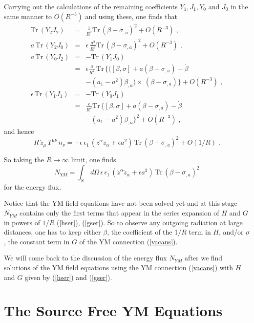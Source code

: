 \documentclass[a4paper,twocolumn,prd,showpacs,amsmath,amssymb]{revtex4}
\begin{document}
Carrying out the calculations of the remaining coefficients $Y_1, J_1, Y_0$
and $J_0$ in the same manner to $O(R^{-3})$ and using these, one finds that
\begin{eqnarray*}
\mbox{Tr} \, (Y_2 J_2) & = & \frac{1}{R^2} \mbox{Tr} \,
(\beta - \sigma_{,a})^2 + O(R^{-3}) \; , \\
a \, \mbox{Tr} \, (Y_2 J_0) & = & \epsilon \, \frac{a^2}{R^2}
\mbox{Tr} \, (\beta - \sigma_{,a})^2 + O(R^{-3}) \; ,\\
a \, \mbox{Tr} \, (Y_0 J_2) & = & - \mbox{Tr} \, (Y_1 J_0) \\
& = & \epsilon \frac{a}{R^2} \, \mbox{Tr} \,
\lbrace ([\beta,\sigma] + a(\beta - \sigma_{,a}) - \dot{\beta} \\
& &- (a_1 - a^2) \beta_{,a}) \times \, (\beta - \sigma_{,a}) \rbrace
+ O(R^{-3}) \; , \\
\epsilon \, \mbox{Tr} \, (Y_1 J_1) & = & - \mbox{Tr} \, (Y_0 J_1) \\
& = & \frac{\epsilon}{R^2} \mbox{Tr} \,
\lbrace [\beta,\sigma] + a(\beta - \sigma_{,a}) - \dot{\beta} \\
& & - (a_1 - a^2) \beta_{,a} \rbrace^2 + O(R^{-3}) \; ,
\end{eqnarray*}
and hence
\[ R\, \dot{z}_{\mu} \, T^{\mu \nu} \, n_{\nu} =
- \epsilon\, \epsilon_{1}\, (\ddot{z}^{\alpha} \ddot{z}_{\alpha} + \epsilon a^2) \,
\mbox{Tr} \, (\beta - \sigma_{,a})^2 + O(1/R) \; . \]

So taking the $R \to \infty$ limit, one finds
\begin{equation}
N_{YM} = \int_{S} \, d\Omega \, \epsilon \, \epsilon_{1} \,
(\ddot{z}^{\alpha} \ddot{z}_{\alpha} + \epsilon a^2) \,
\mbox{Tr} \, (\beta - \sigma_{,a})^2 \label{fluxba}
\end{equation}
for the energy flux.

Notice that the YM field equations have not been solved
yet and at this stage $N_{YM}$ contains only the first terms that appear in
the series expansion of $H$ and $G$ in powers of $1/R$ (\ref{hser}),
(\ref{gser}). So to observe any outgoing radiation at large distances,
one has to keep either $\beta$, the coefficient of the $1/R$ term in $H$,
and/or $\sigma$, the constant term in $G$ of the YM connection (\ref{vacans}).

We will come back to the discussion of the energy flux $N_{YM}$ after we
find solutions of the YM field equations using the YM connection (\ref{vacans})
with $H$ and $G$ given by (\ref{hser}) and (\ref{gser}).

\section{\label{ymeqn} The Source Free YM Equations}
\end{document}
